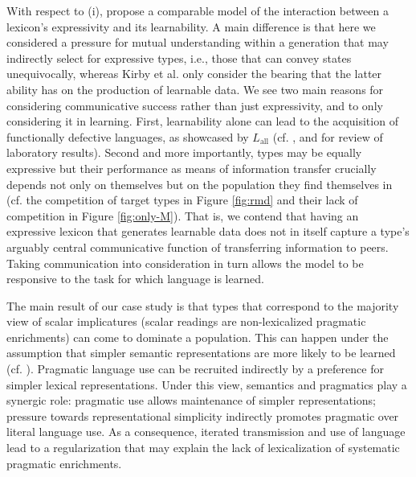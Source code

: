 \documentclass[a4paper, 11pt]{article}
\theoremstyle{Satz}
\newcommand{\mylang}[1]{\ensuremath{L_{\text{#1}}}\xspace} %
\newcommand{\Lall}{\mylang{all}}
\begin{document}
With respect to (i), \citet{kirby+etal:2015} propose a comparable model of the interaction
between a lexicon's expressivity and its learnability. A main difference is that here we
considered a pressure for mutual understanding within a generation that may indirectly select
for expressive types, i.e., those that can convey states unequivocally, whereas Kirby et
al. only consider the bearing that the latter ability has on the production of learnable
data. We see two main reasons for considering communicative success rather than just
expressivity, and to only considering it in learning. First, learnability alone can lead to the
acquisition of functionally defective languages, as showcased by $\Lall$
(cf. \citealt{kirby+etal:2008,silvey+etal:2014}, and \citealt{fay+etal:2013} for review of
laboratory results). Second and more importantly, types may be equally expressive but their
performance as means of information transfer crucially depends not only on themselves but on
the population they find themselves in (cf. the competition of target types in Figure
\ref{fig:rmd} and their lack of competition in Figure \ref{fig:only-M}). That is, we contend
that having an expressive lexicon that generates learnable data does not in itself capture a
type's arguably central communicative function of transferring information to peers. Taking communication
into consideration in turn allows the model to be responsive to the task for which language is learned. 

The main result of our case study is that types that correspond to the majority view of scalar
implicatures (scalar readings are non-lexicalized pragmatic enrichments) can come to dominate a
population. This can happen under the assumption that simpler semantic representations are more
likely to be learned (cf. \citealt{chater+vitanyi:2003}). Pragmatic language use can be
recruited indirectly by a preference for simpler lexical representations. Under this view, semantics
and pragmatics play a synergic role: pragmatic use allows maintenance of simpler representations;
pressure towards representational simplicity indirectly promotes pragmatic over literal
language use. As a consequence, iterated transmission and use of language lead to a
regularization that may explain the lack of lexicalization of systematic pragmatic enrichments.
\end{document}
